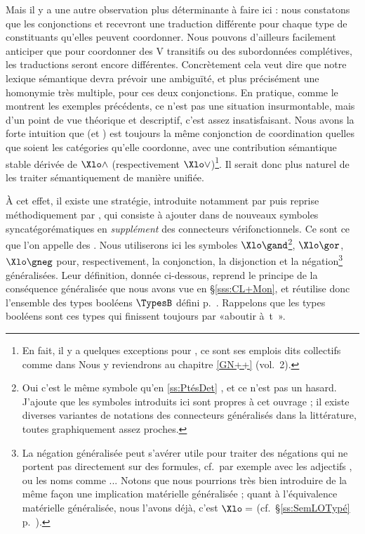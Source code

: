 Mais il y a une autre observation plus déterminante à faire ici : nous constatons que les conjonctions  et  recevront une traduction différente pour chaque type de constituants qu'elles peuvent coordonner.  Nous pouvons d'ailleurs facilement anticiper que pour coordonner des V transitifs ou des subordonnées complétives, les traductions seront encore différentes.  Concrètement cela veut dire que notre lexique sémantique devra prévoir une ambiguïté, et plus précisément une homonymie très multiple, pour ces deux conjonctions.
En pratique, comme le montrent les exemples précédents, ce n'est pas une situation insurmontable, mais d'un point de vue théorique et descriptif, c'est assez insatisfaisant.
Nous avons la forte intuition que  (et ) est toujours la même conjonction de coordination quelles que soient les catégories qu'elle coordonne, avec une contribution sémantique stable dérivée de $\Xlo\wedge$ (respectivement $\Xlo\vee$)\footnote{En fait, il y a quelques exceptions pour , ce sont ses emplois dits collectifs comme dans   Nous y reviendrons au chapitre \ref{GN++} (vol.~2).}.  Il serait donc plus naturel de les traiter sémantiquement de manière unifiée.




À cet effet, il existe
une stratégie, introduite notamment par \citet{Gzdr:80} puis reprise méthodiquement %
par  \citet{PartRooth:83},   %
qui consiste à ajouter dans {\LO} de nouveaux symboles syncatégorématiques en \emph{supplément} des connecteurs vérifonctionnels.  
Ce sont ce que l'on appelle des .  Nous utiliserons ici les symboles 
$\Xlo\gand$\footnote{Oui c'est le même symbole qu'en \ref{ss:PtésDet} , et ce n'est pas un hasard. J'ajoute que les symboles introduits ici sont propres à cet ouvrage ; il existe diverses variantes de notations des connecteurs généralisés dans la littérature, toutes graphiquement assez proches.}, $\Xlo\gor$, $\Xlo\gneg$ pour, respectivement, la conjonction, la disjonction et  la négation\footnote{La négation généralisée peut s'avérer utile pour traiter des négations qui ne portent pas directement sur des formules, cf.\ par exemple avec les adjectifs ,  ou les noms comme ...  Notons que nous pourrions très bien introduire de la même façon une implication matérielle généralisée ; quant à l'équivalence matérielle généralisée, nous l'avons déjà, c'est $\Xlo=$ (cf.\ \S\ref{ss:SemLOTypé} p.~\pageref{H=<->}).}
généralisées.
Leur définition, donnée ci-dessous, reprend le principe de la conséquence généralisée  que nous avons vue en \S\ref{sss:CL+Mon}, et  réutilise donc l'ensemble des types booléens $\TypesB$ défini p.~\pageref{d:TBooleen}.  Rappelons que les types booléens sont ces types qui finissent toujours par «aboutir à~\typ t~».



